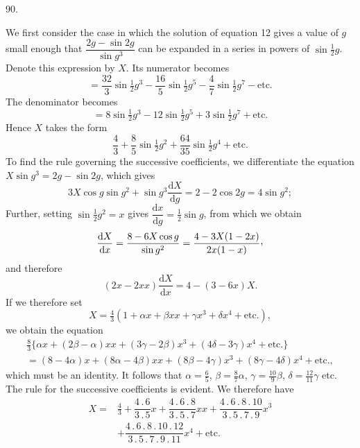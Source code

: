 \par{}\medskip
\hypertarget{native-121-article090}{}
\begin{center}90.\end{center}
We first consider the case in which the solution of equation 12 gives a value of $g$ small enough that $\dfrac{2g-\sin 2g}{\sin g^3}$ can be expanded in a series in powers of $\sin\tfrac12 g$. Denote this expression by $X$. Its numerator becomes
\[
=\dfrac{32}{3}\sin\tfrac12 g^3-\dfrac{16}{5}\sin\tfrac12 g^5-\dfrac47\sin\tfrac12 g^7-\text{etc.}
\]
The denominator becomes
\[
=8\sin\tfrac12 g^3-12\sin\tfrac12 g^5+3\sin\tfrac12 g^7+\text{etc.}
\]
Hence $X$ takes the form
\[
\dfrac43+\dfrac85\sin\tfrac12 g^2+\dfrac{64}{35}\sin\tfrac12 g^4+\text{etc.}
\]
To find the rule governing the successive coefficients, we differentiate the equation $X\sin g^3=2g-\sin 2g$, which gives
\[
3X\cos g\sin g^2+\sin g^3\dfrac{\mathrm{d}X}{\mathrm{d}g}=2-2\cos 2g=4\sin g^2;
\]
Further, setting $\sin\tfrac12 g^2=x$ gives $\dfrac{\mathrm{d}x}{\mathrm{d}g}=\tfrac12\sin g$, from which we obtain
\[
\dfrac{\mathrm{d}X}{\mathrm{d}x}=\dfrac{8-6X\cos g}{\sin g^2}=\dfrac{4-3X(1-2x)}{2x(1-x)}\mathpunct{\raisebox{.45ex}{,}}
\]
and therefore
\[
(2x-2xx)\dfrac{\mathrm{d}X}{\mathrm{d}x}=4-(3-6x)X.
\]
If we therefore set
\[
X=\tfrac43(1+\alpha x+\beta xx+\gamma x^3+\delta x^4+\text{etc.}),
\]
we obtain the equation
\[
\begin{gathered}
\tfrac83\{\alpha x+(2\beta-\alpha)xx+(3\gamma-2\beta)x^3+(4\delta-3\gamma)x^4+\text{etc.}\}
\\[4pt]
=(8-4\alpha)x+(8\alpha-4\beta)xx+(8\beta-4\gamma)x^3+(8\gamma-4\delta)x^4+\text{etc.},
\end{gathered}
\]
which must be an identity. It follows that $\alpha=\tfrac65$, $\beta=\tfrac87\alpha$, $\gamma=\tfrac{10}{9}\beta$, $\delta=\tfrac{12}{11}\gamma$ etc. The rule for the successive coefficients is evident. We therefore have
\[
\begin{aligned}
X={}&\tfrac43+\dfrac{4\mathbin{.}6}{3\mathbin{.}5}x+\dfrac{4\mathbin{.}6\mathbin{.}8}{3\mathbin{.}5\mathbin{.}7}xx+\dfrac{4\mathbin{.}6\mathbin{.}8\mathbin{.}10}{3\mathbin{.}5\mathbin{.}7\mathbin{.}9}x^3
\\[4pt]
&+\dfrac{4\mathbin{.}6\mathbin{.}8\mathbin{.}10\mathbin{.}12}{3\mathbin{.}5\mathbin{.}7\mathbin{.}9\mathbin{.}11}x^4+\text{etc.}
\end{aligned}
\]

